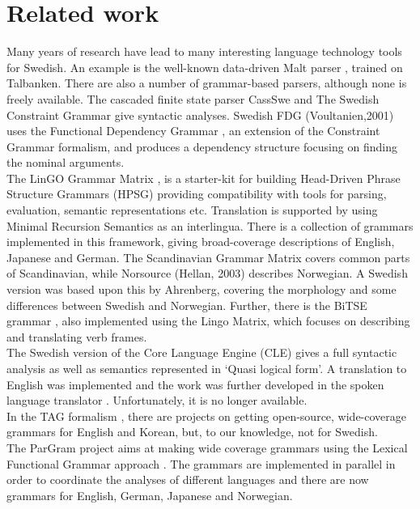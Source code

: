\documentclass[10pt, a4paper]{article}
\begin{document}
\section{Related work}
Many years of research have lead to many interesting language
technology tools for Swedish.
An example is the well-known data-driven Malt parser \cite{malt},
trained on Talbanken. 
There are also a number of grammar-based parsers, although none is freely available.
The cascaded finite state parser CassSwe \cite{casswe} and
The Swedish Constraint Grammar \cite{birn}
give syntactic analyses. 
Swedish FDG (Voultanien,2001) uses the Functional Dependency Grammar
\cite{fdg},
an extension of the Constraint Grammar
formalism, and produces a dependency structure focusing on finding the nominal
arguments. \\
The LinGO Grammar Matrix \cite{matrix}, is a starter-kit for building
Head-Driven Phrase Structure Grammars \cite{hpsg} (HPSG) providing
compatibility with tools for parsing, evaluation, semantic representations etc.
Translation is supported by using Minimal Recursion
Semantics \cite{mrs} as an interlingua. 
There is a collection of grammars implemented in this framework, giving broad-coverage
descriptions of 
English, Japanese and German. 
The Scandinavian Grammar Matrix \cite{scandmatrix} covers common parts of
Scandinavian, while Norsource (Hellan, 2003) describes Norwegian. A Swedish version
was based upon this by Ahrenberg, covering the morphology and some
differences between Swedish and Norwegian. Further, there is the BiTSE 
grammar \cite{stymne}, also implemented using the Lingo Matrix,
which focuses on describing and translating verb frames.\\ 
The Swedish version of the Core Language Engine (CLE) \cite{gamback}
gives a full syntactic analysis as well as semantics represented in `Quasi logical form'. A
translation to English  was implemented and the work was further developed in the spoken
language translator \cite{spoken}. Unfortunately, it is no longer available.\\
In the TAG formalism \cite{tag}, there are projects on getting open-source, wide-coverage grammars
for English and Korean, but, to our knowledge, not for Swedish.  \\
The ParGram \cite{pargram} project aims at making wide coverage grammars using
the Lexical Functional Grammar approach \cite{lfg}.
The grammars are implemented in parallel in order to coordinate the analyses of
different languages and there are now grammars for English, German, Japanese and Norwegian. 
\end{document}
